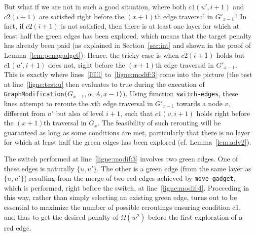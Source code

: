 \documentclass[11pt]{article}
\begin{document}
{But what if we are not in such a good situation, where both $c1(u',i+1)$ and $c2(i+1)$ are satisfied right before the $(x+1)$th edge traversal in $G'_{x-1}$? In fact, if $c2(i+1)$ is not satisfied, then there is at least one layer for which at least half the green edges has been explored, which means that the target penalty has already been paid (as explained in Section~\ref{sec:int} and shown in the proof of Lemma~\ref{lem:penagadget}). Hence, the tricky case is when $c2(i+1)$ holds but $c1(u',i+1)$ does not, right before the $(x+1)$th edge traversal in $G'_{x-1}$. This is exactly where lines~\ref{llllll} to~\ref{ligne:modif:3} come into the picture (the test at line~\ref{ligne:test:u} then evaluates to true during the execution of {\tt GraphModification($G_{x-1},\alpha,A,x-1$)}). Using function {\tt switch\mbox{-}edges}, these lines attempt to reroute the $x$th edge traversal in $G'_{x-1}$ towards a node $v$, different from $u'$ but also of level $i+1$, such that $c1(v,i+1)$ holds right before the $(x+1)$th traversal in $G_x$. The feasibility of such rerouting will be guaranteed as long as some conditions are met, particularly that there is no layer for which at least half the green edges has been explored (cf. Lemma~\ref{lem:adv2}).

The switch performed at line~\ref{ligne:modif:3} involves two green edges. One of these edges is naturally $\{u,u'\}$. The other is a green edge (from the same layer as $\{u,u'\}$) resulting from the merge of two red edges achieved by {\tt move\mbox{-}gadget}, which is performed, right before the switch, at line~\ref{ligne:modif:4}. Proceeding in this way, rather than simply selecting an existing green edge, turns out to be essential to maximize the number of possible reroutings ensuring condition c1, and thus to get the desired penalty of $\Omega(w^2)$ before the first exploration of a red edge.

}
\end{document}
